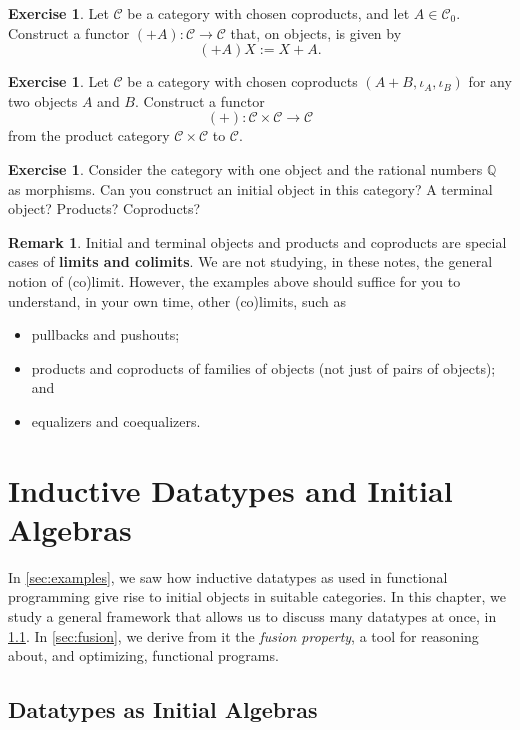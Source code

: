 \documentclass[a4paper,11pt, oneside,titlepage=false]{scrbook}
\theoremstyle{plain}
\theoremstyle{definition}
\newtheorem{rem}[thm]{Remark}
\newtheorem{exer}[thm]{Exercise}
\newcommand{\Cat}[1]{\mathcal{#1}}
\newcommand{\CC}{\Cat{C}}
\newcommand{\Ob}[1]{{#1}_0}
\begin{document}
\begin{exer}
  Let $\CC$ be a category with chosen coproducts, and let $A \in \Ob\CC$.
  Construct a functor $(+ A) : \CC \to \CC$ that, on objects, is given by
  \[ (+ A) X := X + A. \]
\end{exer}

\begin{exer}
  Let $\CC$ be a category with chosen coproducts $(A + B, \iota_A, \iota_B)$ for any two objects $A$ and $B$.
  Construct a functor
  \[ (+) : \CC\times \CC \to \CC\]
  from the product category $\CC\times \CC$ to $\CC$.
\end{exer}

\begin{exer}
  Consider the category with one object and the rational numbers $\mathbb{Q}$ as morphisms.
  Can you construct an initial object in this category? A terminal object? Products? Coproducts?
\end{exer}

\begin{rem}
  Initial and terminal objects and products and coproducts are special cases of \textbf{limits and colimits}.
  We are not studying, in these notes, the general notion of (co)limit.
  However, the examples above should suffice for you to understand, in your own time, other (co)limits, such as
  \begin{itemize}
  \item pullbacks and pushouts;
  \item products and coproducts of families of objects (not just of pairs of objects); and
  \item equalizers and coequalizers.
  \end{itemize}
\end{rem}

\chapter{Inductive Datatypes and Initial Algebras}
\label{sec:initial-algs}

In \cref{sec:examples}, we saw how inductive datatypes as used in functional
programming give rise to initial objects in suitable categories.
In this chapter, we study a general framework that allows us to discuss many
datatypes at once, in \cref{sec:datatypes-as-initial}.
In \cref{sec:fusion}, we derive from it the \emph{fusion property}, a tool for
reasoning about, and optimizing, functional programs.

\section{Datatypes as Initial Algebras}
\label{sec:datatypes-as-initial}
\end{document}
